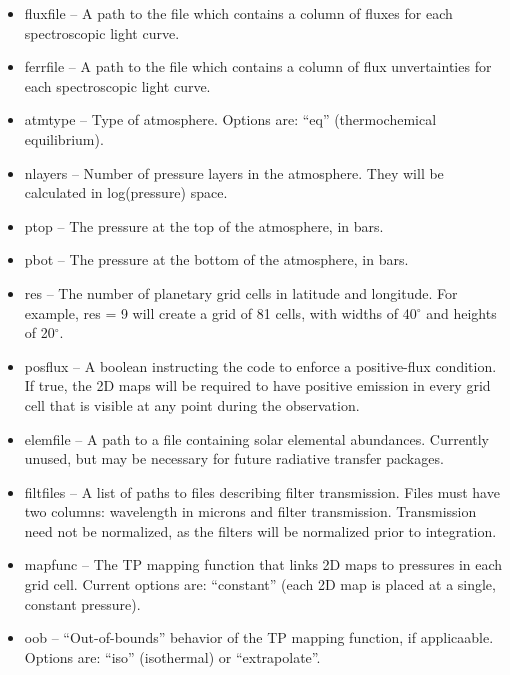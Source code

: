 \documentclass[12pt]{article}
\begin{document}
\begin{itemize}
\begin{itemize}
  \item fluxfile -- A path to the file which contains a column of fluxes for
    each spectroscopic light curve.

  \item ferrfile -- A path to the file which contains a column of flux
    unvertainties for each spectroscopic light curve.

  \item atmtype -- Type of atmosphere. Options are: ``eq''
    (thermochemical equilibrium).

  \item nlayers -- Number of pressure layers in the atmosphere. They will
    be calculated in log(pressure) space.

  \item ptop -- The pressure at the top of the atmosphere, in bars.

  \item pbot -- The pressure at the bottom of the atmosphere, in bars.

  \item res -- The number of planetary grid cells in latitude and
    longitude.  For example, res = 9 will create a grid of 81 cells,
    with widths of 40$^\circ$ and heights of 20$^\circ$.

  \item posflux -- A boolean instructing the code to enforce a
    positive-flux condition. If true, the 2D maps will be required to
    have positive emission in every grid cell that is visible at any
    point during the observation.

  \item elemfile -- A path to a file containing solar elemental abundances.
    Currently unused, but may be necessary for future radiative transfer
    packages.

  \item filtfiles -- A list of paths to files describing filter
    transmission.  Files must have two columns: wavelength in microns
    and filter transmission. Transmission need not be normalized, as
    the filters will be normalized prior to integration.

  \item mapfunc -- The TP mapping function that links
    2D maps to pressures in each grid cell. Current options are: ``constant''
    (each 2D map is placed at a single, constant pressure).

  \item oob -- ``Out-of-bounds'' behavior of the TP mapping function, if
    applicaable. Options are: ``iso'' (isothermal) or ``extrapolate''.


\end{itemize}
\end{itemize}
\end{document}
